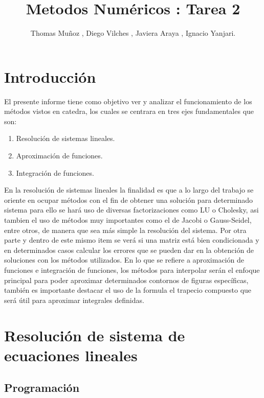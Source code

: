 \documentclass{udpreport}
\title{Metodos Numéricos : Tarea 2}
\author{Thomas Muñoz , Diego Vilches , Javiera Araya , Ignacio Yanjari.}
\begin{document}
\maketitle
\tableofcontents
\listoffigures
\chapter{Introducción}
El presente informe tiene como objetivo ver  y analizar el funcionamiento de los métodos vistos en catedra, los cuales se centrara en tres ejes fundamentales que son:
\begin{enumerate}
\item Resolución de sistemas lineales.
\item Aproximación de funciones.
\item Integración de funciones. 
\end{enumerate}

En la resolución de sistemas lineales la finalidad es que a lo largo del trabajo se oriente en ocupar métodos con el fin de obtener una solución para determinado sistema para ello se hará uso de diversas factorizaciones como LU o Cholesky,  asi tambien el uso de métodos muy importantes como el de Jacobi o Gauss-Seidel, entre otros, de manera que sea más simple la resolución del sistema. Por otra parte y dentro de este mismo item se verá si una matriz está bien condicionada  y en determinados casos calcular los errores que se pueden dar en  la obtención de soluciones con los métodos utilizados.
En lo que se refiere a aproximación de funciones e integración de funciones, los métodos para interpolar serán el enfoque principal para poder aproximar determinados contornos de figuras específicas, también es importante destacar el uso de la formula el trapecio compuesto que será útil para aproximar integrales definidas.
\newpage

\chapter{Resolución de sistema de ecuaciones lineales} %
 \section{Programación}
 
\end{document}

